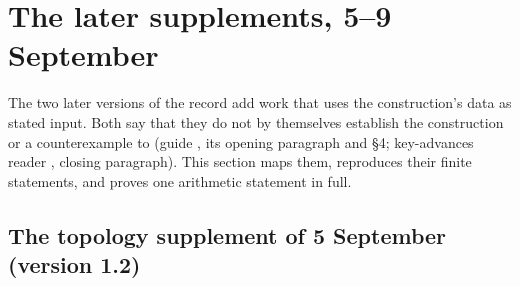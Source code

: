 \section{The later supplements, 5--9 September}\label{sec:later}

The two later versions of the record add work that uses the construction's data as stated input. Both say that they do not by themselves establish the construction or a counterexample to \cite{CDP20} (guide , its opening paragraph and §4; key-advances reader , closing paragraph). This section maps them, reproduces their finite statements, and proves one arithmetic statement in full.

\subsection{The topology supplement of 5 September (version 1.2)}

